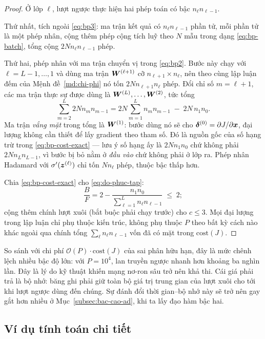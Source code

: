 \begin{proof}
Ở lớp $\ell$, lượt ngược thực hiện hai phép toán có bậc $n_\ell n_{\ell-1}$.
 
Thứ nhất, tích ngoài \eqref{eq:bp3}: ma trận kết quả có $n_\ell n_{\ell-1}$ phần
tử, mỗi phần tử là một phép nhân, cộng thêm phép cộng tích luỹ theo $N$ mẫu
trong dạng \eqref{eq:bp-batch}, tổng cộng $2N n_\ell n_{\ell-1}$ phép.
 
Thứ hai, phép nhân với ma trận chuyển vị trong \eqref{eq:bp2}. Bước này chạy với
$\ell = L-1,\dots,1$ và dùng ma trận $\bm{W}^{(\ell+1)}$ cỡ
$n_{\ell+1}\times n_\ell$, nên theo cùng lập luận đếm của
Mệnh đề~\ref{md:chi-phi} nó tốn $2N n_{\ell+1} n_\ell$ phép. Đổi chỉ số
$m = \ell+1$, các ma trận thực sự được dùng là $\bm{W}^{(L)},\dots,\bm{W}^{(2)}$, tức
tổng
\[
\sum_{m=2}^{L} 2N n_m n_{m-1}
 = 2N\sum_{m=1}^{L} n_m n_{m-1} \;-\; 2N\, n_1 n_0 .
\]
Ma trận \emph{vắng mặt} trong tổng là $\bm{W}^{(1)}$: bước dùng nó sẽ cho
$\bm{\delta}^{(0)} = \partial J/\partial\bm{x}$, đại lượng không cần thiết để lấy
gradient theo tham số. Đó là nguồn gốc của số hạng trừ trong
\eqref{eq:bp-cost-exact} --- lưu ý số hạng ấy là $2N n_1 n_0$ chứ không phải
$2N n_L n_{L-1}$, vì bước bị bỏ nằm ở \emph{đầu vào} chứ không phải ở lớp ra.
Phép nhân Hadamard với $\sigma'(\bm{z}^{(\ell)})$ chỉ tốn $N n_\ell$ phép, thuộc
bậc thấp hơn.
 
Chia \eqref{eq:bp-cost-exact} cho \eqref{eq:do-phuc-tap}:
\[
\frac{B}{F} = 2 - \frac{n_1 n_0}{\sum_{\ell=1}^{L} n_\ell n_{\ell-1}} \;\le\; 2 ;
\] cộng thêm chính lượt xuôi (bắt buộc phải chạy trước) cho $c \le 3$. Mọi
đại lượng trong lập luận chỉ phụ thuộc kiến trúc, không phụ thuộc $P$ theo bất kỳ
cách nào khác ngoài qua chính tổng $\sum_\ell n_\ell n_{\ell-1}$ vốn đã có mặt
trong $\mathrm{cost}(J)$.
\end{proof}
 
So sánh với chi phí $\mathcal{O}(P)\cdot\mathrm{cost}(J)$ của sai phân hữu hạn,
đây là mức chênh lệch nhiều bậc độ lớn: với $P = 10^4$, lan truyền ngược nhanh
hơn khoảng ba nghìn lần. Đây là lý do kỹ thuật khiến mạng nơ-ron sâu trở nên khả
thi. Cái giá phải trả là bộ nhớ: băng ghi phải giữ toàn bộ giá trị trung gian của
lượt xuôi cho tới khi lượt ngược dùng đến chúng. Sự đánh đổi thời gian--bộ nhớ
này sẽ trở nên gay gắt hơn nhiều ở Mục~\ref{subsec:bac-cao-ad}, khi ta lấy đạo
hàm bậc hai.
 
\subsection{Ví dụ tính toán chi tiết}
\label{subsec:vd-backprop}
 
